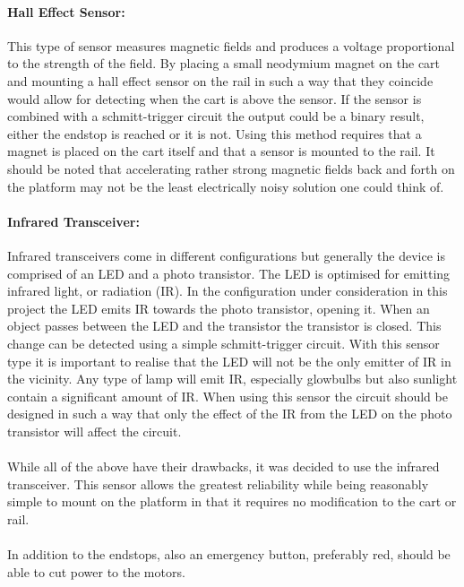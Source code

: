 \paragraph{Hall Effect Sensor:} %
\label{par:hall_effect_sensor}
This type of sensor measures magnetic fields and produces a voltage proportional to the strength of the field.
By placing a small neodymium magnet on the cart and mounting a hall effect sensor on the rail in such a way that they coincide would allow for detecting when the cart is above the sensor.
If the sensor is combined with a schmitt-trigger circuit the output could be a binary result, either the endstop is reached or it is not.
Using this method requires that a magnet is placed on the cart itself and that a sensor is mounted to the rail.
It should be noted that accelerating rather strong magnetic fields back and forth on the platform may not be the least electrically noisy solution one could think of.
\paragraph{Infrared Transceiver:} %
\label{par:infrared_transceiver}
Infrared transceivers come in different configurations but generally the device is comprised of an LED and a photo transistor.
The LED is optimised for emitting infrared light, or radiation (IR).
In the configuration under consideration in this project the LED emits IR towards the photo transistor, opening it.
When an object passes between the LED and the transistor the transistor is closed.
This change can be detected using a simple schmitt-trigger circuit. 
With this sensor type it is important to realise that the LED will not be the only emitter of IR in the vicinity.
Any type of lamp will emit IR, especially glowbulbs but also sunlight contain a significant amount of IR.
When using this sensor the circuit should be designed in such a way that only the effect of the IR from the LED on the photo transistor will affect the circuit.
\\~\\
While all of the above have their drawbacks, it was decided to use the infrared transceiver.
This sensor allows the greatest reliability while being reasonably simple to mount on the platform in that it requires no modification to the cart or rail.
\\~\\
In addition to the endstops, also an emergency button, preferably red, should be able to cut power to the motors.

